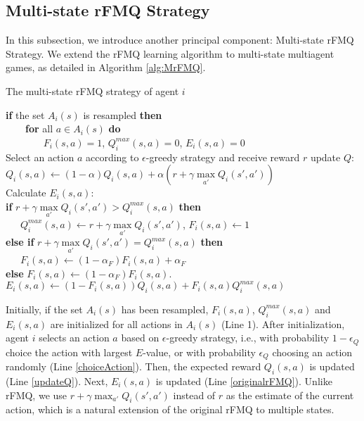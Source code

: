 \documentclass[journal,transmag]{IEEEtran}
\begin{document}
\subsection{Multi-state rFMQ Strategy}

In this subsection, we introduce another principal component: Multi-state rFMQ Strategy. We extend the rFMQ learning algorithm to multi-state multiagent games, as detailed in Algorithm \ref{alg:MrFMQ}.

\begin{algorithm}[h]
\caption{The multi-state rFMQ strategy of agent $i$ }
\label{alg:MrFMQ}
\begin{algorithmic}[1]
\STATE \textbf{if} the set $A_i(s)$ is resampled \textbf{then} \\
    ~~~~\textbf{for} all $a \in A_i(s)$ \textbf{do}\\
    ~~~~~~~ $F_i(s,a)=1$, $Q_{i}^{max}(s,a)=0$, $E_i(s,a)=0$ \\
\STATE Select an action $a$ according to $\epsilon$-greedy strategy and receive reward $r$ \label{choiceAction}
\STATE update $Q$:\\
    ${Q_i}(s,a)\leftarrow(1-\alpha)Q_i(s,a)+\alpha({r+\gamma\mathop{\max}\limits_{a'}{Q_i}(s',a')})$\\ \label{updateQ}
\STATE Calculate $E_{i}(s,a)$:\\
    \textbf{if} ${r + \gamma \mathop {\max }\limits_{a'} {Q_i}(s',a')} > Q_{i}^{max}(s,a)$ \textbf{then} \\
    ~~~$Q_{i}^{max}(s,a) \leftarrow {r + \gamma \mathop {\max }\limits_{a'} {Q_i}(s',a')} $, $F_i(s,a)\leftarrow 1$ \\
    \textbf{else if} ${r + \gamma \mathop {\max }\limits_{a'} {Q_i}(s',a')} = Q_{i}^{max}(s,a)$ \textbf{then} \\
    ~~~$F_i(s,a)\leftarrow (1-\alpha_F)F_i(s,a)+\alpha_F$ \\
    \textbf{else} $F_i(s,a)\leftarrow (1-\alpha_F)F_i(s,a)$.\\
    $E_i(s,a)\leftarrow(1-F_i(s,a))Q_i(s,a)+F_i(s,a)Q_{i}^{max}(s,a)$  \label{originalrFMQ}
\end{algorithmic}
\end{algorithm}

Initially, if the set $A_i(s)$ has been resampled, $F_i(s,a)$, $Q_{i}^{max}(s,a)$ and $E_i(s,a)$ are initialized for all actions in $A_i(s)$ (Line 1). After initialization, agent $i$ selects an action $a$ based on $\epsilon$-greedy strategy, i.e., with probability $1-\epsilon_{Q}$ choice the action with largest $E$-value, or with probability $\epsilon_{Q}$ choosing an action randomly (Line \ref{choiceAction}). Then, the expected reward $Q_i(s,a)$ is updated (Line \ref{updateQ}). Next, $E_i(s,a)$ is updated (Line \ref{originalrFMQ}).  Unlike rFMQ, we use $r + \gamma \mathop {\max }\nolimits_{a'} {Q_i}(s',a')$ instead of $r$ as the estimate of the current action, which is a natural extension of the original rFMQ to multiple states. %
\end{document}
